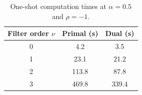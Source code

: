 \begin{table}[t]
 \centering
 \caption{One-shot computation times at $\alpha=0.5$ and $\rho=-1$.}
 \label{tab:coupled-heat-timing}
 \begin{tabular}{@{}ccc@{}}
  \toprule
  Filter order $\nu$ & Primal (s) & Dual (s)\\
  \midrule
  0 & 4.2 & 3.5\\
  1 & 23.1 & 21.2\\
  2 & 113.8 & 87.8\\
  3 & 469.8 & 339.4\\
  \bottomrule
 \end{tabular}
\end{table}
